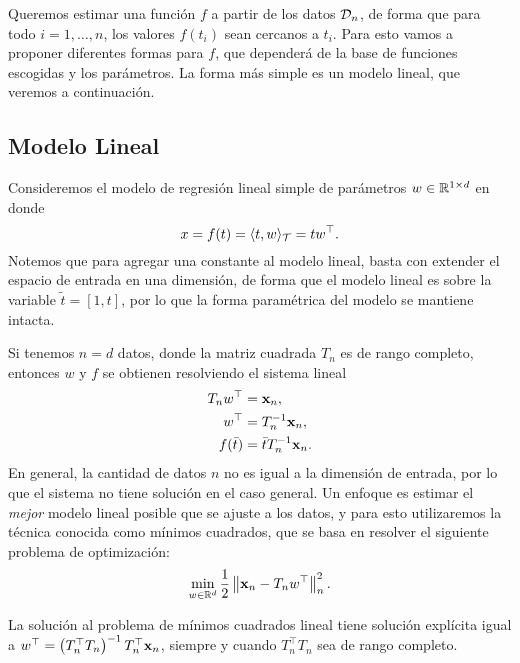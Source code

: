 Queremos estimar una función \(f\) a partir de los datos \(\mathcal{D}_n\), de forma que para todo \(i = 1, \dotsc, n\), los valores \(f(t_i)\) sean cercanos a \(t_i\). Para esto vamos a proponer diferentes formas para \(f\), que dependerá de la base de funciones escogidas y los parámetros. La forma más simple es un modelo lineal, que veremos a continuación.

\subsection{Modelo Lineal}

Consideremos el modelo de regresión lineal simple de parámetros \(w \in \mathbb{R}^{1 \times d}\) en donde
\begin{equation*}
	x = f(t) = \langle t, w \rangle_{\mathcal{T}} = t w^{\top}.
\end{equation*}%
Notemos que para agregar una constante al modelo lineal, basta con extender el espacio de entrada en una dimensión, de forma que el modelo lineal es sobre la variable \(\tilde{t} = [1, t]\), por lo que la forma paramétrica del modelo se mantiene intacta.

Si tenemos \(n = d\) datos, donde la matriz cuadrada \(T_n\) es de rango completo, entonces \(w\) y \(f\) se obtienen resolviendo el sistema lineal
\begin{align*}
	T_n w^{\top}	&= \mathbf{x}_n,\\
	w^{\top}		&= T_n^{-1} \mathbf{x}_n,\\
	f(\bar{t})		&= \bar{t} T_n^{-1} \mathbf{x}_n.
\end{align*}%
En general, la cantidad de datos \(n\) no es igual a la dimensión de entrada, por lo que el sistema no tiene solución en el caso general. Un enfoque es estimar el \emph{mejor} modelo lineal posible que se ajuste a los datos, y para esto utilizaremos la técnica conocida como mínimos cuadrados, que se basa en resolver el siguiente problema de optimización:
\begin{equation*}
	\min_{w \in \mathbb{R}^d} \frac{1}{2} \left\Vert \mathbf{x}_n - T_n w^{\top} \right\Vert_n^2.
\end{equation*}

\begin{proposition}
	La solución al problema de mínimos cuadrados lineal tiene solución explícita igual a \(w^{\top} = \left(T_n^{\top} T_n\right)^{-1} T_n^{\top} \mathbf{x}_n\), siempre y cuando \(T_n^{\top} T_n\) sea de rango completo.
\end{proposition}

